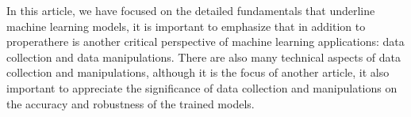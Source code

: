 
\par
In this article, we have focused on the detailed fundamentals that underline machine learning models, it is important to emphasize that in addition to properathere is another critical perspective of machine learning applications: data collection and data manipulations. There are also many technical aspects of data collection and manipulations, although it is the focus of another article, it also important to appreciate the significance of data collection and manipulations on the accuracy and robustness of the trained models.
\par 
